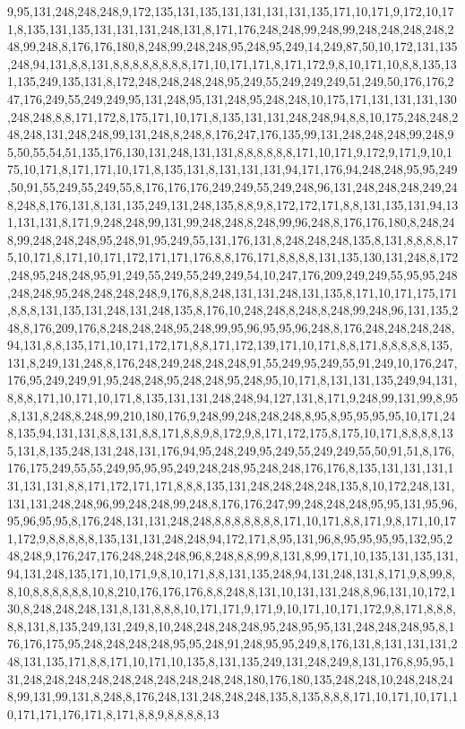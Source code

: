 9,95,131,248,248,248,9,172,135,131,135,131,131,131,131,135,171,10,171,9,172,10,171,8,135,131,135,131,131,131,248,131,8,171,176,248,248,99,248,99,248,248,248,248,248,99,248,8,176,176,180,8,248,99,248,248,95,248,95,249,14,249,87,50,10,172,131,135,248,94,131,8,8,131,8,8,8,8,8,8,8,8,171,10,171,171,8,171,172,9,8,10,171,10,8,8,135,131,135,249,135,131,8,172,248,248,248,248,95,249,55,249,249,249,51,249,50,176,176,247,176,249,55,249,249,95,131,248,95,131,248,95,248,248,10,175,171,131,131,131,130,248,248,8,8,171,172,8,175,171,10,171,8,135,131,131,248,248,94,8,8,10,175,248,248,248,248,131,248,248,99,131,248,8,248,8,176,247,176,135,99,131,248,248,248,99,248,95,50,55,54,51,135,176,130,131,248,131,131,8,8,8,8,8,8,171,10,171,9,172,9,171,9,10,175,10,171,8,171,171,10,171,8,135,131,8,131,131,131,94,171,176,94,248,248,95,95,249,50,91,55,249,55,249,55,8,176,176,176,249,249,55,249,248,96,131,248,248,248,249,248,248,8,176,131,8,131,135,249,131,248,135,8,8,9,8,172,172,171,8,8,131,135,131,94,131,131,131,8,171,9,248,248,99,131,99,248,248,8,248,99,96,248,8,176,176,180,8,248,248,99,248,248,248,95,248,91,95,249,55,131,176,131,8,248,248,248,135,8,131,8,8,8,8,175,10,171,8,171,10,171,172,171,171,176,8,8,176,171,8,8,8,8,131,135,130,131,248,8,172,248,95,248,248,95,91,249,55,249,55,249,249,54,10,247,176,209,249,249,55,95,95,248,248,248,95,248,248,248,248,9,176,8,8,248,131,131,248,131,135,8,171,10,171,175,171,8,8,8,131,135,131,248,131,248,135,8,176,10,248,248,8,248,8,248,99,248,96,131,135,248,8,176,209,176,8,248,248,248,95,248,99,95,96,95,95,96,248,8,176,248,248,248,248,94,131,8,8,135,171,10,171,172,171,8,8,171,172,139,171,10,171,8,8,171,8,8,8,8,8,135,131,8,249,131,248,8,176,248,249,248,248,248,91,55,249,95,249,55,91,249,10,176,247,176,95,249,249,91,95,248,248,95,248,248,95,248,95,10,171,8,131,131,135,249,94,131,8,8,8,171,10,171,10,171,8,135,131,131,248,248,94,127,131,8,171,9,248,99,131,99,8,95,8,131,8,248,8,248,99,210,180,176,9,248,99,248,248,248,8,95,8,95,95,95,95,10,171,248,135,94,131,131,8,8,131,8,8,171,8,8,9,8,172,9,8,171,172,175,8,175,10,171,8,8,8,8,135,131,8,135,248,131,248,131,176,94,95,248,249,95,249,55,249,249,55,50,91,51,8,176,176,175,249,55,55,249,95,95,95,249,248,248,95,248,248,176,176,8,135,131,131,131,131,131,131,8,8,171,172,171,171,8,8,8,135,131,248,248,248,248,135,8,10,172,248,131,131,131,248,248,96,99,248,248,99,248,8,176,176,247,99,248,248,248,95,95,131,95,96,95,96,95,95,8,176,248,131,131,248,248,8,8,8,8,8,8,8,171,10,171,8,8,171,9,8,171,10,171,172,9,8,8,8,8,8,135,131,131,248,248,94,172,171,8,95,131,96,8,95,95,95,95,132,95,248,248,9,176,247,176,248,248,248,96,8,248,8,8,99,8,131,8,99,171,10,135,131,135,131,94,131,248,135,171,10,171,9,8,10,171,8,8,131,135,248,94,131,248,131,8,171,9,8,99,8,8,10,8,8,8,8,8,8,10,8,210,176,176,176,8,8,248,8,131,10,131,131,248,8,96,131,10,172,130,8,248,248,248,131,8,131,8,8,8,10,171,171,9,171,9,10,171,10,171,172,9,8,171,8,8,8,8,8,131,8,135,249,131,249,8,10,248,248,248,248,95,248,95,95,131,248,248,248,95,8,176,176,175,95,248,248,248,248,95,95,248,91,248,95,95,249,8,176,131,8,131,131,131,248,131,135,171,8,8,171,10,171,10,135,8,131,135,249,131,248,249,8,131,176,8,95,95,131,248,248,248,248,248,248,248,248,248,248,180,176,180,135,248,248,10,248,248,248,99,131,99,131,8,248,8,176,248,131,248,248,248,135,8,135,8,8,8,171,10,171,10,171,10,171,171,176,171,8,171,8,8,9,8,8,8,8,13